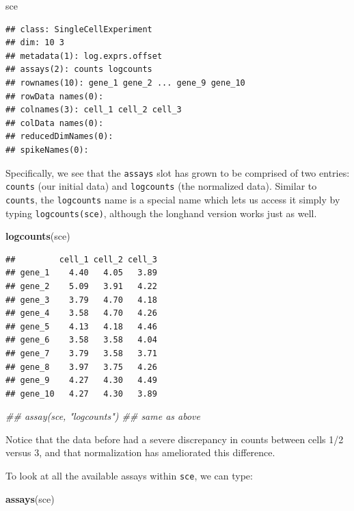\documentclass[]{book}
\newenvironment{Shaded}{\begin{snugshade}}{\end{snugshade}}
\newcommand{\CommentTok}[1]{\textcolor[rgb]{0.56,0.35,0.01}{\textit{#1}}}
\newcommand{\KeywordTok}[1]{\textcolor[rgb]{0.13,0.29,0.53}{\textbf{#1}}}
\newcommand{\NormalTok}[1]{#1}
\begin{document}
\begin{Shaded}
\begin{Highlighting}[]
\NormalTok{sce}
\end{Highlighting}
\end{Shaded}

\begin{verbatim}
## class: SingleCellExperiment 
## dim: 10 3 
## metadata(1): log.exprs.offset
## assays(2): counts logcounts
## rownames(10): gene_1 gene_2 ... gene_9 gene_10
## rowData names(0):
## colnames(3): cell_1 cell_2 cell_3
## colData names(0):
## reducedDimNames(0):
## spikeNames(0):
\end{verbatim}

Specifically, we see that the \texttt{assays} slot has grown to be comprised of two entries: \texttt{counts} (our initial data) and \texttt{logcounts} (the normalized data). Similar to \texttt{counts}, the \texttt{logcounts} name is a special name which lets us access it simply by typing \texttt{logcounts(sce)}, although the longhand version works just as well.

\begin{Shaded}
\begin{Highlighting}[]
\KeywordTok{logcounts}\NormalTok{(sce)}
\end{Highlighting}
\end{Shaded}

\begin{verbatim}
##         cell_1 cell_2 cell_3
## gene_1    4.40   4.05   3.89
## gene_2    5.09   3.91   4.22
## gene_3    3.79   4.70   4.18
## gene_4    3.58   4.70   4.26
## gene_5    4.13   4.18   4.46
## gene_6    3.58   3.58   4.04
## gene_7    3.79   3.58   3.71
## gene_8    3.97   3.75   4.26
## gene_9    4.27   4.30   4.49
## gene_10   4.27   4.30   3.89
\end{verbatim}

\begin{Shaded}
\begin{Highlighting}[]
\CommentTok{## assay(sce, "logcounts") ## same as above}
\end{Highlighting}
\end{Shaded}

Notice that the data before had a severe discrepancy in counts between cells 1/2 versus 3, and that normalization has ameliorated this difference.

To look at all the available assays within \texttt{sce}, we can type:

\begin{Shaded}
\begin{Highlighting}[]
\KeywordTok{assays}\NormalTok{(sce)}
\end{Highlighting}
\end{Shaded}
\end{document}
